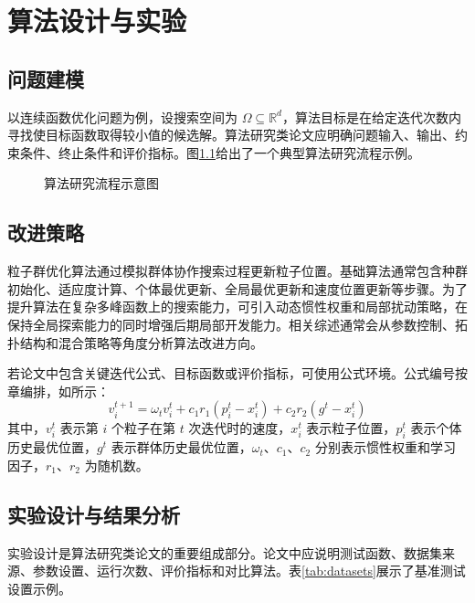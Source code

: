 \chapter{算法设计与实验}

\section{问题建模}

以连续函数优化问题为例，设搜索空间为 $\Omega\subseteq\mathbb{R}^{d}$，算法目标是在给定迭代次数内寻找使目标函数取得较小值的候选解。算法研究类论文应明确问题输入、输出、约束条件、终止条件和评价指标。图\ref{fig:framework}给出了一个典型算法研究流程示例。

\begin{figure}[htbp]
  \centering
  \caption{算法研究流程示意图}
  \label{fig:framework}
\end{figure}

\section{改进策略}

粒子群优化算法通过模拟群体协作搜索过程更新粒子位置。基础算法通常包含种群初始化、适应度计算、个体最优更新、全局最优更新和速度位置更新等步骤。为了提升算法在复杂多峰函数上的搜索能力，可引入动态惯性权重和局部扰动策略，在保持全局探索能力的同时增强后期局部开发能力。相关综述通常会从参数控制、拓扑结构和混合策略等角度分析算法改进方向。

若论文中包含关键迭代公式、目标函数或评价指标，可使用公式环境。公式编号按章编排，如所示：
\begin{equation}
  v_i^{t+1}=\omega_t v_i^t+c_1 r_1(p_i^t-x_i^t)+c_2 r_2(g^t-x_i^t)
  \label{eq:update}
\end{equation}
其中，$v_i^t$ 表示第 $i$ 个粒子在第 $t$ 次迭代时的速度，$x_i^t$ 表示粒子位置，$p_i^t$ 表示个体历史最优位置，$g^t$ 表示群体历史最优位置，$\omega_t$、$c_1$、$c_2$ 分别表示惯性权重和学习因子，$r_1$、$r_2$ 为随机数。

\section{实验设计与结果分析}

实验设计是算法研究类论文的重要组成部分。论文中应说明测试函数、数据集来源、参数设置、运行次数、评价指标和对比算法。表\ref{tab:datasets}展示了基准测试设置示例。


